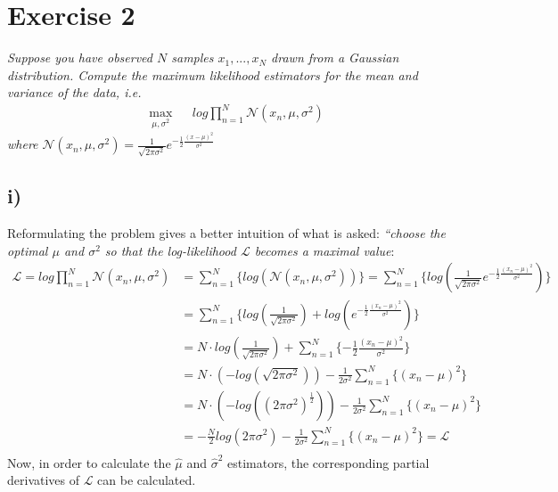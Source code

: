 \documentclass[11pt]{scrartcl} %
\begin{document}
\section*{Exercise 2}
         {\it Suppose you have observed \(N\) samples \(x_1, ..., x_N\) drawn from a Gaussian distribution. Compute the maximum likelihood estimators for the mean and variance of the data, i.e.  \begin{equation*}
             \begin{aligned}
               & \underset{\mu, \sigma^2}{\text{max}}
               & & log \prod_{n=1}^{N}\mathcal{N}(x_n, \mu, \sigma^2)
             \end{aligned}
           \end{equation*}
           where   \(\mathcal{N}(x_n, \mu, \sigma^2) = \frac{1}{\sqrt{2\pi\sigma^2}}e^{-\frac{1}{2}\frac{(x-\mu)^2}{\sigma^2}}\)

	   \subsection*{i)}
           Reformulating the problem gives a better intuition of what is asked: {\it ``choose the optimal \(\mu\) and \(\sigma^2\) so that the log-likelihood \(\mathcal{L}\) becomes a maximal value}:
             \begin{equation}\label{eq:8}
               \begin{split}
                 \mathcal{L} = log \prod_{n=1}^{N}\mathcal{N}(x_n, \mu, \sigma^2) &= \sum_{n=1}^{N}\{log(\mathcal{N}(x_n, \mu, \sigma^2))\}
                 = \sum_{n=1}^{N}\{log(\frac{1}{\sqrt{2\pi\sigma^2}}e^{-\frac{1}{2}\frac{(x_n-\mu)^2}{\sigma^2}})\}\\              
                 &= \sum_{n=1}^{N}\{log(\frac{1}{\sqrt{2\pi\sigma^2}})+ log(e^{-\frac{1}{2}\frac{(x_n-\mu)^2}{\sigma^2}})\}\\
                 &= N\cdot log(\frac{1}{\sqrt{2\pi\sigma^2}}) + \sum_{n=1}^{N}\{-\frac{1}{2}\frac{(x_n-\mu)^2}{\sigma^2}\}\\
                 &= N\cdot (-log(\sqrt{2\pi\sigma^2})) -\frac{1}{2\sigma^2}\sum_{n=1}^{N}\{(x_n-\mu)^2\}\\
                 &= N\cdot (-log((2\pi\sigma^2)^{\frac{1}{2}}))  -\frac{1}{2\sigma^2}\sum_{n=1}^{N}\{(x_n-\mu)^2\}\\
                 &= -\frac{N}{2}log(2\pi\sigma^2) -\frac{1}{2\sigma^2}\sum_{n=1}^{N}\{(x_n-\mu)^2\} = \mathcal{L}\\
               \end{split}
             \end{equation}
             Now, in order to calculate the \(\hat\mu\) and \(\hat\sigma^2\) estimators, the corresponding partial derivatives of \(\mathcal{L}\) can be calculated.

}
\end{document}
